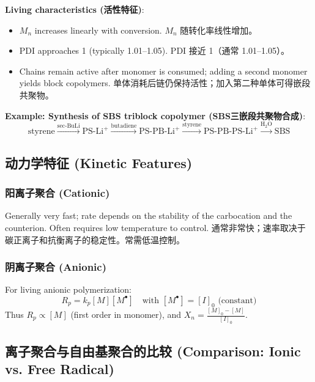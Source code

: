 \documentclass[12pt,a4paper]{ctexart}
\begin{document}
\textbf{Living characteristics (活性特征)}:
\begin{itemize}
    \item $M_n$ increases linearly with conversion.  
      $M_n$ 随转化率线性增加。
    \item PDI approaches 1 (typically 1.01–1.05).  
      PDI 接近 1（通常 1.01–1.05）。
    \item Chains remain active after monomer is consumed; adding a second monomer yields block copolymers.  
      单体消耗后链仍保持活性；加入第二种单体可得嵌段共聚物。
\end{itemize}

\textbf{Example: Synthesis of SBS triblock copolymer (SBS三嵌段共聚物合成)}:
\[
\text{styrene} \xrightarrow{\text{sec-BuLi}} \text{PS-Li}^+ \xrightarrow{\text{butadiene}} \text{PS-PB-Li}^+ \xrightarrow{\text{styrene}} \text{PS-PB-PS-Li}^+ \xrightarrow{\text{H}_2\text{O}} \text{SBS}
\]

\subsection{动力学特征 (Kinetic Features)}

\subsubsection{阳离子聚合 (Cationic)}
Generally very fast; rate depends on the stability of the carbocation and the counterion. Often requires low temperature to control.  
通常非常快；速率取决于碳正离子和抗衡离子的稳定性。常需低温控制。

\subsubsection{阴离子聚合 (Anionic)}
For living anionic polymerization:
\[
R_p = k_p [M][M^\bullet] \quad \text{with } [M^\bullet] = [I]_0 \text{ (constant)}
\]
Thus $R_p \propto [M]$ (first order in monomer), and $X_n = \frac{[M]_0 - [M]}{[I]_0}$.

\subsection{离子聚合与自由基聚合的比较 (Comparison: Ionic vs. Free Radical)}
\end{document}
